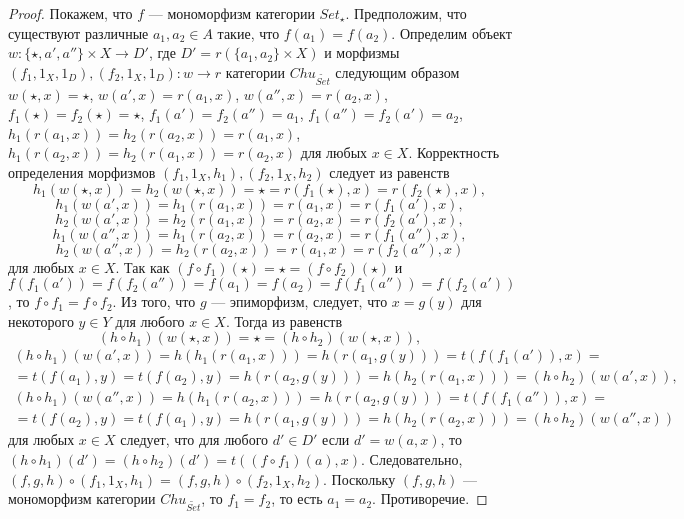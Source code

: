 \documentclass[a4paper,12pt]{article}
\begin{document}
\begin{proof}
    Покажем, что $f$ --- мономорфизм категории $Set_{\star}$. Предположим, что существуют различные $a_1, a_2 \in A$ такие, что $f(a_1) = f(a_2)$. Определим объект $w: \{\star,a',a''\} \times X \to D'$, где $D' = r(\{a_1,a_2\} \times X)$ и морфизмы $(f_1,1_X,1_D), (f_2,1_X,1_D): w \to r$ категории $Chu_{\widetilde{Set}}$ следующим образом $w(\star,x) = \star$, $w(a',x) = r(a_1,x)$, $w(a'',x) = r(a_2,x)$, $f_1(\star) = f_2(\star) = \star$, $f_1(a') = f_2(a'') = a_1$, $f_1(a'') = f_2(a') = a_2$, $h_1(r(a_1,x)) = h_2(r(a_2,x)) = r(a_1,x)$, $h_1(r(a_2,x)) = h_2(r(a_1,x)) = r(a_2,x)$ для любых $x \in X$. Корректность определения морфизмов $(f_1,1_X,h_1), (f_2,1_X,h_2)$ следует из равенств
    $$
        h_1(w(\star,x)) = h_2(w(\star,x)) = \star = r(f_1(\star),x) = r(f_2(\star),x),
    $$
    $$
        h_1(w(a',x)) = h_1(r(a_1,x)) = r(a_1,x) = r(f_1(a'),x),
    $$
    $$
        h_2(w(a',x)) = h_2(r(a_1,x)) = r(a_2,x) = r(f_2(a'),x),
    $$
    $$
        h_1(w(a'',x)) = h_1(r(a_2,x)) = r(a_2,x) = r(f_1(a''),x),
    $$
    $$
        h_2(w(a'',x)) = h_2(r(a_2,x)) = r(a_1,x) = r(f_2(a''),x)
    $$
    для любых $x \in X$.
    Так как $(f \circ f_1)(\star) = \star = (f \circ f_2)(\star)$ и $f(f_1(a')) = f(f_2(a'')) = f(a_1) = f(a_2) = f(f_1(a'')) = f(f_2(a'))$,
    то $f \circ f_1 = f \circ f_2$. Из того, что $g$ --- эпиморфизм, следует, что $x = g(y)$ для некоторого $y \in Y$ для любого $x \in X$. Тогда из равенств
    $$
        (h \circ h_1)(w(\star,x)) = \star = (h \circ h_2)(w(\star,x)),
    $$
    \begin{multline*}
        (h \circ h_1)(w(a',x)) = h(h_1(r(a_1,x))) = h(r(a_1,g(y))) = t(f(f_1(a')),x)  =\\= 
        t(f(a_1),y) = t(f(a_2),y) = h(r(a_2,g(y))) = h(h_2(r(a_1,x))) = (h \circ h_2)(w(a',x)),
    \end{multline*}
    \begin{multline*}
        (h \circ h_1)(w(a'',x)) = h(h_1(r(a_2,x))) = h(r(a_2,g(y))) = t(f(f_1(a'')),x)  =\\= 
        t(f(a_2),y) = t(f(a_1),y) = h(r(a_1,g(y))) = h(h_2(r(a_2,x))) = (h \circ h_2)(w(a'',x))
    \end{multline*}
    для любых $x \in X$ следует, что для любого $d' \in D'$ если $d' = w(a,x)$, то $(h \circ h_1)(d') = (h \circ h_2)(d') = t((f \circ f_1)(a),x)$. Следовательно, $(f,g,h) \circ (f_1,1_X,h_1) = (f,g,h) \circ (f_2,1_X,h_2)$. Поскольку $(f,g,h)$ --- мономорфизм категории $Chu_{\widetilde{Set}}$, то $f_1 = f_2$, то есть $a_1 = a_2$. Противоречие.


\end{proof}
\end{document}
